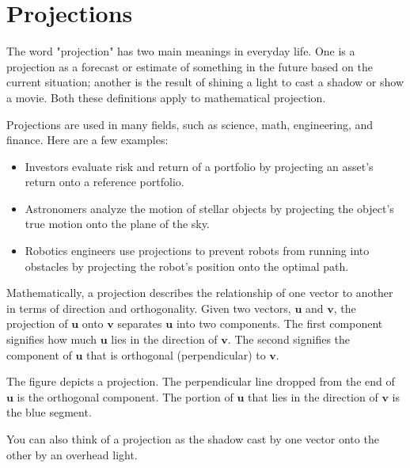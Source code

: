 \chapter{Projections}

The word "projection" has two main meanings in everyday life. One is a projection as a forecast or estimate of something in the future based on the current situation; another is the result of shining a light to cast a shadow or show a movie. Both these definitions apply to mathematical projection.

Projections are used in many fields, such as science, math, engineering, and finance. Here are a few examples: 
\begin{itemize}
\item Investors evaluate risk and return of a portfolio by projecting an asset’s return onto a reference portfolio.
\item Astronomers analyze the motion of stellar objects by projecting the object’s true motion onto the plane of the sky.
\item Robotics engineers use projections to prevent robots from running into obstacles by projecting the robot’s position onto the optimal path.
\end{itemize}

Mathematically, a projection describes the relationship of one vector to another in terms of direction and orthogonality. Given two vectors, $\mathbf{u}$ and $\mathbf{v}$, the projection of $\mathbf{u}$ onto $\mathbf{v}$ separates $\mathbf{u}$ into two components. The first component signifies how much $\mathbf{u}$ lies in the direction of $\mathbf{v}$. The second signifies the component of $\mathbf{u}$ that is orthogonal (perpendicular) to $\mathbf{v}$.  

The figure depicts a projection. The perpendicular line dropped from the end of $\mathbf{u}$ is the orthogonal component. The portion of $\mathbf{u}$ that lies in the direction of $\mathbf{v}$ is the blue segment. 


You can also think of a projection as the shadow cast by one vector onto the other by an overhead light.

